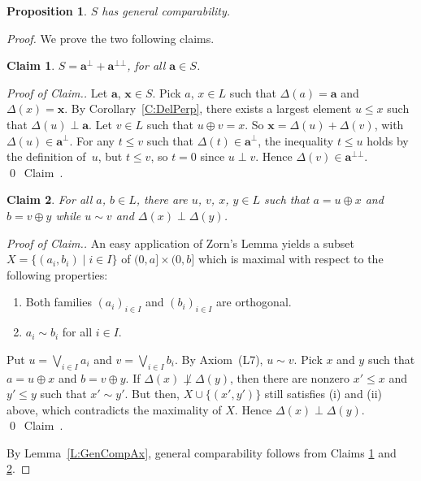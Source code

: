 \documentclass[psamsfonts,reqno]{memo-l}
\theoremstyle{plain}
\newtheorem{proposition}[lemma]{Proposition}
\newtheorem{claim}{Claim}
\theoremstyle{definition}
\theoremstyle{remark}
\newcommand{\qedc}{{\qed}~{\rm Claim~{\theclaim}.}}
\newenvironment{cproof}
{\begin{proof}[Proof of Claim.]}
{\qedc\renewcommand{\qed}{}\end{proof}}
\numberwithin{equation}{section}
\newcommand{\la}{\boldsymbol{a}}
\newcommand{\lx}{\boldsymbol{x}}
\newcommand{\DD}{\Delta}
\newcommand{\set}[1]{\{#1\}}
\newcommand{\setm}[2]{\set{#1\mid#2}}
\newcommand{\famm}[2]{(#1)_{#2}}
\begin{document}
\begin{proposition}\label{P:ShasGC}
$S$ has general comparability.
\end{proposition}

\begin{proof}
We prove the two following claims.

\setcounter{claim}{0}

\begin{claim}\label{Cl:abot+abotbot=S}
$S=\la^\bot+\la^{\bot\bot}$, for all $\la\in S$.
\end{claim}

\begin{cproof}
Let $\la$, $\lx\in S$.
Pick $a$, $x\in L$ such that $\DD(a)=\la$ and $\DD(x)=\lx$. By
Corollary~\ref{C:DelPerp}, there exists a largest element $u\leq x$ such
that $\DD(u)\perp\la$. Let $v\in L$ such that $u\oplus v=x$. So
$\lx=\DD(u)+\DD(v)$, with $\DD(u)\in\la^\bot$. For any $t\leq v$ such that
$\DD(t)\in\la^\bot$, the inequality $t\leq u$ holds by the definition of~$u$,
but $t\leq v$, so $t=0$ since $u\perp v$. Hence $\DD(v)\in\la^{\bot\bot}$.
\end{cproof}

\begin{claim}\label{Cl:abcxyperp}
For all $a$, $b\in L$, there are $u$, $v$, $x$, $y\in L$ such that
$a=u\oplus x$ and $b=v\oplus y$ while $u\sim v$ and $\DD(x)\perp\DD(y)$.
\end{claim}

\begin{cproof}
An easy application of Zorn's Lemma yields a subset
$X=\setm{(a_i,b_i)}{i\in I}$ of $(0,a]\times(0,b]$
which is maximal with respect to the following properties:
\begin{enumerate}
\item Both families $\famm{a_i}{i\in I}$ and $\famm{b_i}{i\in I}$ are
orthogonal.

\item $a_i\sim b_i$ for all $i\in I$.
\end{enumerate}

Put $u=\bigvee_{i\in I}a_i$ and $v=\bigvee_{i\in I}b_i$. By Axiom~(L7),
$u\sim v$. Pick $x$ and $y$ such that $a=u\oplus x$ and $b=v\oplus y$. If
$\DD(x)\not\perp\DD(y)$, then there are nonzero $x'\leq x$ and $y'\leq y$
such that $x'\sim y'$. But then, $X\cup\set{(x',y')}$
still satisfies (i) and (ii) above, which contradicts the maximality of $X$.
Hence $\DD(x)\perp\DD(y)$.
\end{cproof}

By Lemma~\ref{L:GenCompAx}, general comparability follows from Claims
\ref{Cl:abot+abotbot=S} and \ref{Cl:abcxyperp}.
\end{proof}
\end{document}
